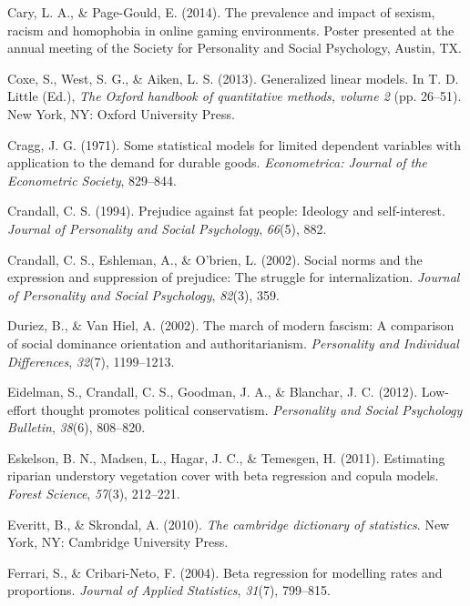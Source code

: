 \documentclass[english,man]{apa6}
\newcounter{author}
\theoremstyle{definition}
\theoremstyle{definition}
\theoremstyle{remark}
\begin{document}
\hypertarget{ref-cary2014prevalence}{}
Cary, L. A., \& Page-Gould, E. (2014). The prevalence and impact of
sexism, racism and homophobia in online gaming environments. Poster
presented at the annual meeting of the Society for Personality and
Social Psychology, Austin, TX.

\hypertarget{ref-coxe2013generalized}{}
Coxe, S., West, S. G., \& Aiken, L. S. (2013). Generalized linear
models. In T. D. Little (Ed.), \emph{The Oxford handbook of quantitative
methods, volume 2} (pp. 26--51). New York, NY: Oxford University Press.

\hypertarget{ref-cragg1971some}{}
Cragg, J. G. (1971). Some statistical models for limited dependent
variables with application to the demand for durable goods.
\emph{Econometrica: Journal of the Econometric Society}, 829--844.

\hypertarget{ref-crandall1994prejudice}{}
Crandall, C. S. (1994). Prejudice against fat people: Ideology and
self-interest. \emph{Journal of Personality and Social Psychology},
\emph{66}(5), 882.

\hypertarget{ref-crandall2002social}{}
Crandall, C. S., Eshleman, A., \& O'brien, L. (2002). Social norms and
the expression and suppression of prejudice: The struggle for
internalization. \emph{Journal of Personality and Social Psychology},
\emph{82}(3), 359.

\hypertarget{ref-duriez2002march}{}
Duriez, B., \& Van Hiel, A. (2002). The march of modern fascism: A
comparison of social dominance orientation and authoritarianism.
\emph{Personality and Individual Differences}, \emph{32}(7), 1199--1213.

\hypertarget{ref-eidelman2012low}{}
Eidelman, S., Crandall, C. S., Goodman, J. A., \& Blanchar, J. C.
(2012). Low-effort thought promotes political conservatism.
\emph{Personality and Social Psychology Bulletin}, \emph{38}(6),
808--820.

\hypertarget{ref-eskelson2011estimating}{}
Eskelson, B. N., Madsen, L., Hagar, J. C., \& Temesgen, H. (2011).
Estimating riparian understory vegetation cover with beta regression and
copula models. \emph{Forest Science}, \emph{57}(3), 212--221.

\hypertarget{ref-everitt2002cambridge}{}
Everitt, B., \& Skrondal, A. (2010). \emph{The cambridge dictionary of
statistics}. New York, NY: Cambridge University Press.

\hypertarget{ref-ferrari2004beta}{}
Ferrari, S., \& Cribari-Neto, F. (2004). Beta regression for modelling
rates and proportions. \emph{Journal of Applied Statistics},
\emph{31}(7), 799--815.
\end{document}
